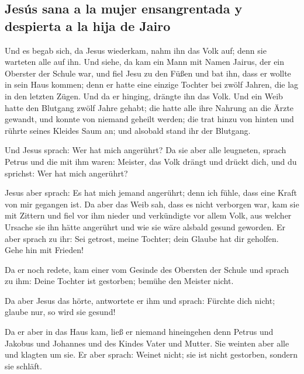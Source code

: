 \hypertarget{jesuxfas-sana-a-la-mujer-ensangrentada-y-despierta-a-la-hija-de-jairo}{%
\subsection{Jesús sana a la mujer ensangrentada y despierta a la hija de
Jairo}\label{jesuxfas-sana-a-la-mujer-ensangrentada-y-despierta-a-la-hija-de-jairo}}

 Und es begab sich, da Jesus wiederkam, nahm ihn das Volk
auf; denn sie warteten alle auf ihn.  Und siehe, da kam
ein Mann mit Namen Jairus, der ein Oberster der Schule war, und fiel
Jesu zu den Füßen und bat ihn, dass er wollte in sein Haus kommen;
 denn er hatte eine einzige Tochter bei zwölf Jahren, die
lag in den letzten Zügen. Und da er hinging, drängte ihn das Volk.
 Und ein Weib hatte den Blutgang zwölf Jahre gehabt; die
hatte alle ihre Nahrung an die Ärzte gewandt, und konnte von niemand
geheilt werden;  die trat hinzu von hinten und rührte
seines Kleides Saum an; und alsobald stand ihr der Blutgang.

 Und Jesus sprach: Wer hat mich angerührt? Da sie aber
alle leugneten, sprach Petrus und die mit ihm waren: Meister, das Volk
drängt und drückt dich, und du sprichst: Wer hat mich angerührt?

 Jesus aber sprach: Es hat mich jemand angerührt; denn
ich fühle, dass eine Kraft von mir gegangen ist.  Da aber
das Weib sah, dass es nicht verborgen war, kam sie mit Zittern und fiel
vor ihm nieder und verkündigte vor allem Volk, aus welcher Ursache sie
ihn hätte angerührt und wie sie wäre alsbald gesund geworden.
 Er aber sprach zu ihr: Sei getrost, meine Tochter; dein
Glaube hat dir geholfen. Gehe hin mit Frieden!

 Da er noch redete, kam einer vom Gesinde des Obersten
der Schule und sprach zu ihm: Deine Tochter ist gestorben; bemühe den
Meister nicht.

 Da aber Jesus das hörte, antwortete er ihm und sprach:
Fürchte dich nicht; glaube nur, so wird sie gesund!

 Da er aber in das Haus kam, ließ er niemand hineingehen
denn Petrus und Jakobus und Johannes und des Kindes Vater und Mutter.
 Sie weinten aber alle und klagten um sie. Er aber
sprach: Weinet nicht; sie ist nicht gestorben, sondern sie schläft.

